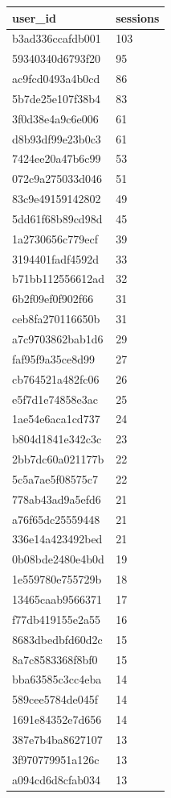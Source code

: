 \begin{tabular}{ll}
\toprule
user\_id & sessions \\
\midrule
b3ad336ccafdb001 & 103 \\
59340340d6793f20 & 95 \\
ac9fcd0493a4b0cd & 86 \\
5b7de25e107f38b4 & 83 \\
3f0d38e4a9c6e006 & 61 \\
d8b93df99e23b0c3 & 61 \\
7424ee20a47b6c99 & 53 \\
072c9a275033d046 & 51 \\
83c9e49159142802 & 49 \\
5dd61f68b89cd98d & 45 \\
1a2730656c779ecf & 39 \\
3194401fadf4592d & 33 \\
b71bb112556612ad & 32 \\
6b2f09ef0f902f66 & 31 \\
ceb8fa270116650b & 31 \\
a7c9703862bab1d6 & 29 \\
faf95f9a35ce8d99 & 27 \\
cb764521a482fc06 & 26 \\
e5f7d1e74858e3ac & 25 \\
1ae54e6aca1cd737 & 24 \\
b804d1841e342c3c & 23 \\
2bb7dc60a021177b & 22 \\
5c5a7ae5f08575c7 & 22 \\
778ab43ad9a5efd6 & 21 \\
a76f65dc25559448 & 21 \\
336e14a423492bed & 21 \\
0b08bde2480e4b0d & 19 \\
1e559780e755729b & 18 \\
13465caab9566371 & 17 \\
f77db419155e2a55 & 16 \\
8683dbedbfd60d2c & 15 \\
8a7c8583368f8bf0 & 15 \\
bba63585c3cc4eba & 14 \\
589cee5784de045f & 14 \\
1691e84352e7d656 & 14 \\
387e7b4ba8627107 & 13 \\
3f970779951a126c & 13 \\
a094cd6d8cfab034 & 13 \\

\end{tabular}
